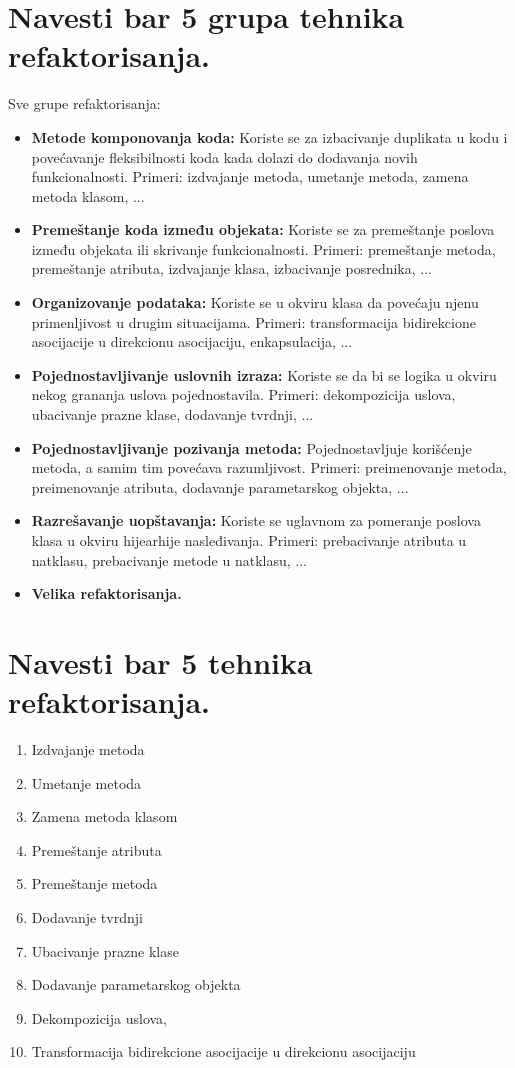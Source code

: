 \documentclass[a4paper]{article}
\begin{document}
\section{Navesti bar 5 grupa tehnika refaktorisanja.}
  Sve grupe refaktorisanja:
  \begin{itemize}
    \item \textbf{Metode komponovanja koda:} Koriste se za izbacivanje duplikata u kodu i
          povećavanje fleksibilnosti koda kada dolazi do dodavanja novih funkcionalnosti.
          Primeri: izdvajanje metoda, umetanje metoda, zamena metoda klasom, ... 
    \item \textbf{Premeštanje koda između objekata:} Koriste se za premeštanje poslova
          između objekata ili skrivanje funkcionalnosti. Primeri: premeštanje metoda,
          premeštanje atributa, izdvajanje klasa, izbacivanje posrednika, ...
    \item \textbf{Organizovanje podataka:} Koriste se u okviru klasa da povećaju njenu
          primenljivost u drugim situacijama. Primeri: transformacija bidirekcione
          asocijacije u direkcionu asocijaciju, enkapsulacija, ...
    \item \textbf{Pojednostavljivanje uslovnih izraza:} Koriste se da bi se logika u okviru
          nekog grananja uslova pojednostavila. Primeri: dekompozicija uslova, ubacivanje 
          prazne klase, dodavanje tvrdnji, ...
    \item \textbf{Pojednostavljivanje pozivanja metoda:} Pojednostavljuje korišćenje metoda, a 
          samim tim povećava razumljivost. Primeri: preimenovanje metoda, preimenovanje 
          atributa, dodavanje parametarskog objekta, ... 
    \item \textbf{Razrešavanje uopštavanja:} Koriste se uglavnom za pomeranje poslova klasa
          u okviru hijearhije nasleđivanja. Primeri: prebacivanje atributa u natklasu,
          prebacivanje metode u natklasu, ...
    \item \textbf{Velika refaktorisanja.}
  \end{itemize}

\section{Navesti bar 5 tehnika refaktorisanja.}
  \begin{enumerate}
    \item Izdvajanje metoda
    \item Umetanje metoda
    \item Zamena metoda klasom
    \item Premeštanje atributa
    \item Premeštanje metoda
    \item Dodavanje tvrdnji
    \item Ubacivanje prazne klase
    \item Dodavanje parametarskog objekta
    \item Dekompozicija uslova,
    \item Transformacija bidirekcione asocijacije u direkcionu asocijaciju
  \end{enumerate}
\end{document}
